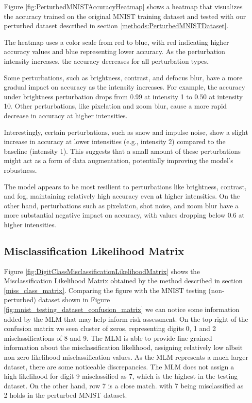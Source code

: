 Figure \ref{fig:PerturbedMNISTAccuracyHeatmap} shows a heatmap that visualizes the accuracy trained on the original MNIST training dataset and tested with our perturbed dataset described in section \ref{methods:PerturbedMNISTDataset}.

The heatmap uses a color scale from red to blue, with red indicating higher accuracy values and blue representing lower accuracy. As the perturbation intensity increases, the accuracy decreases for all perturbation types.

Some perturbations, such as brightness, contrast, and defocus blur, have a more gradual impact on accuracy as the intensity increases. For example, the accuracy under brightness perturbation drops from 0.99 at intensity 1 to 0.50 at intensity 10. Other perturbations, like pixelation and zoom blur, cause a more rapid decrease in accuracy at higher intensities.

Interestingly, certain perturbations, such as snow and impulse noise, show a slight increase in accuracy at lower intensities (e.g., intensity 2) compared to the baseline (intensity 1). This suggests that a small amount of these perturbations might act as a form of data augmentation, potentially improving the model's robustness.

The model appears to be most resilient to perturbations like brightness, contrast, and fog, maintaining relatively high accuracy even at higher intensities. On the other hand, perturbations such as pixelation, shot noise, and zoom blur have a more substantial negative impact on accuracy, with values dropping below 0.6 at higher intensities.


\subsection{Misclassification Likelihood Matrix}

Figure \ref{fig:DigitClassMisclassificationLikelihoodMatrix} shows the Misclassification Likelihood Matrix obtained by the method described in section \ref{miss_class_matrix}. Comparing the figure with the MNIST testing (non-perturbed) dataset shown in Figure \ref{fig:mnist_testing_dataset_confusion_matrix} we can notice some information added by the MLM that may help inform risk assessment. On the top right of the confusion matrix we seea cluster of zeros, representing digits 0, 1 and 2 misclassifications of 8 and 9. The MLM is able to provide fine-grained information about the misclassification likelihood, assigning relatively low albeit non-zero likelihood misclassification values.
As the MLM represents a much larger dataset, there are some noticeable discrepancies. The MLM does not assign a high likelihood for digit 9 misclassified as 7, which is the highest in the testing dataset. On the other hand, row 7 is a close match. with 7 being misclassified as 2 holds in the perturbed MNIST dataset.



